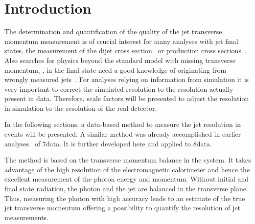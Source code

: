 \chapter{Introduction}
\label{res:ch:Introduction}

The determination and quantification of the quality of the jet transverse momentum measurement is of crucial interest for many analyses with jet final states, \eg the measurement of the dijet cross section~\cite{bib:CMS:QCD_measurements} or \ttbar production cross sections~\cite{bib:CMS:TopCrossSection_8TeV}. 
Also searches for physics beyond the standard model with missing transverse momentum, \PTm, in the final state need a good knowledge of \PTm originating from wrongly measured jets~\cite{bib:CMS:RA2_8TeV,bib:CMS:MT2_8TeV,bib:CMS:AlphaT_8TeV}.
For analyses relying on information from simulation it is very important to correct the simulated resolution to the resolution actually present in data.
Therefore, scale factors will be presented to adjust the resolution in simulation to the resolution of the real detector.  
  
In the following sections, a data-based method to measure the jet \pt resolution in \GAMJET events will be presented. 
A similar method was already accomplished in earlier analyses~\cite{bib:CMS:JERCPaper_2011,bib:CMS-AN-2010-076,bib:CMS-AN-2010-141,bib:CMS-AN-2011-004} of 7\tev data.  
It is further developed here and applied to 8\tev data.

The method is based on the transverse momentum balance in the \GAMJET system. 
It takes advantage of the high resolution of the electromagnetic calorimeter and hence the excellent measurement of the photon energy and momentum.
Without initial and final state radiation, the photon and the jet are balanced in the transverse plane. 
Thus, measuring the photon \pt with high accuracy leads to an estimate of the true jet transverse momentum offering a possibility to quantify the resolution of jet \pt measurements.


